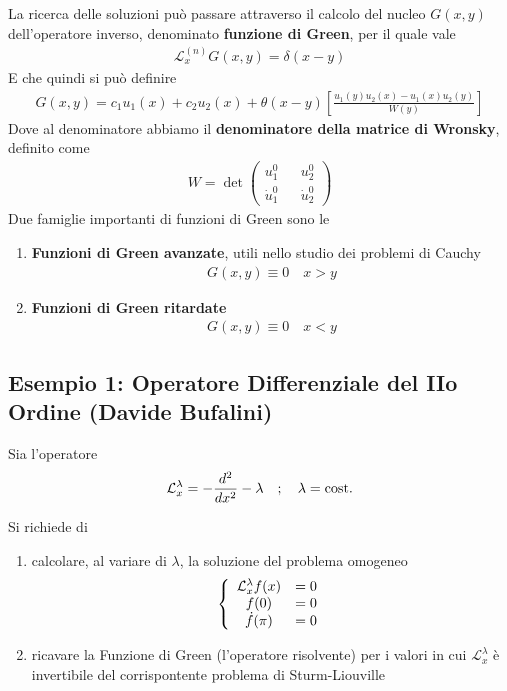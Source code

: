 La ricerca delle soluzioni può passare attraverso il calcolo del nucleo $G(x,y)$ dell'operatore inverso, denominato \textbf{funzione di Green}, per il quale vale
\begin{align}
	\mathcal{L}_x^{(n)} G(x,y) = \delta(x-y)
\end{align}
E che quindi si può definire
\begin{align}
	G(x,y) = c_1 u_1(x) + c_2 u_2(x) + \theta(x-y) \left[ \frac{u_1(y)u_2(x) - u_1(x)u_2(y)}{W(y)} \right]
\end{align}
Dove al denominatore abbiamo il \textbf{denominatore della matrice di Wronsky}, definito come
\begin{align}
	W = \det \begin{pmatrix}
		u_1^0 && u_2^0\\
		\dot{u}_1^0 && \dot{u}_2^0
	\end{pmatrix}
\end{align}
Due famiglie importanti di funzioni di Green sono le
\begin{enumerate}
	\item \textbf{Funzioni di Green avanzate}, utili nello studio dei problemi di Cauchy
	\begin{align}
		G(x,y) \equiv 0 \quad x>y
	\end{align}
	\item \textbf{Funzioni di Green ritardate}
	\begin{align}
		G(x,y) \equiv 0 \quad x<y
	\end{align}
\end{enumerate}

\newpage


\subsection{Esempio 1: Operatore Differenziale del IIo Ordine (Davide Bufalini)}

Sia l'operatore
\begin{align}
	\mathcal{L}_x^\lambda = -\frac{d^2}{dx^2} - \lambda \quad ; \quad \lambda= \text{cost.}
\end{align}

Si richiede di
\begin{enumerate}
	\item calcolare, al variare di $\lambda$, la soluzione del problema omogeneo
	\begin{align}
		\left\{ \begin{array}{ccc} \mathcal{L}_x^\lambda f(x) &= 0\\ f(0) &=0\\ \dot{f}(\pi) &=0 \end{array} \right.
	\end{align}
	\item ricavare la Funzione di Green (l'operatore risolvente) per i valori in cui $\mathcal{L}_x^\lambda$ è invertibile del corrispontente problema di Sturm-Liouville
\end{enumerate}

